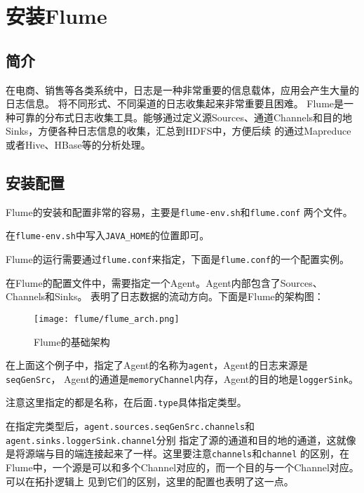 \section{安装Flume}
\subsection{简介}
在电商、销售等各类系统中，日志是一种非常重要的信息载体，应用会产生大量的日志信息。
将不同形式、不同渠道的日志收集起来非常重要且困难。
Flume是一种可靠的分布式日志收集工具。能够通过定义源Sources、通道Channels和目的地Sinks，方便各种日志信息的收集，汇总到HDFS中，方便后续
的通过Mapreduce或者Hive、HBase等的分析处理。

\subsection{安装配置}

Flume的安装和配置非常的容易，主要是\lstinline{flume-env.sh}和\lstinline{flume.conf}
两个文件。



在\lstinline{flume-env.sh}中写入\lstinline{JAVA_HOME}的位置即可。

Flume的运行需要通过\lstinline{flume.conf}来指定，下面是\lstinline{flume.conf}的一个配置实例。



在Flume的配置文件中，需要指定一个Agent。Agent内部包含了Sources、Channels和Sinks。
表明了日志数据的流动方向。下面是Flume的架构图：

\begin{figure}[h]
	\centering
	\texttt{[image: flume/flume\_arch.png]}
	\caption{Flume的基础架构}
	\label{fig:flume_arch}
\end{figure}

在上面这个例子中，指定了Agent的名称为\lstinline{agent}，Agent的日志来源是\lstinline{seqGenSrc}，
Agent的通道是\lstinline{memoryChannel}内存，Agent的目的地是\lstinline{loggerSink}。

注意这里指定的都是名称，在后面\lstinline{.type}具体指定类型。

在指定完类型后，\lstinline{agent.sources.seqGenSrc.channels}和\lstinline{agent.sinks.loggerSink.channel}分别
指定了源的通道和目的地的通道，这就像是将源端与目的端连接起来了一样。这里要注意\lstinline{channels}和\lstinline{channel}
的区别，在Flume中，一个源是可以和多个Channel对应的，而一个目的与一个Channel对应。可以在拓扑逻辑上
见到它们的区别，这里的配置也表明了这一点。


